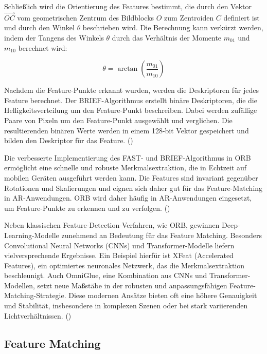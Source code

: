 Schließlich wird die Orientierung des Features bestimmt, die durch den Vektor \( \overrightarrow{OC} \) vom geometrischen Zentrum des Bildblocks \( O \) zum Zentroiden \( C \) definiert ist und durch den Winkel \( \theta \) beschrieben wird. Die Berechnung kann verkürzt werden, indem der Tangens des Winkels \( \theta \) durch das Verhältnis der Momente \( m_{01} \) und \( m_{10} \) berechnet wird:

\begin{equation}
    \theta = \arctan \left( \frac{m_{01}}{m_{10}} \right)
\end{equation}

Nachdem die Feature-Punkte erkannt wurden, werden die Deskriptoren für jedes Feature berechnet. Der BRIEF-Algorithmus erstellt binäre Deskriptoren, die die Helligkeitsverteilung um den Feature-Punkt beschreiben. Dabei werden zufällige Paare von Pixeln um den Feature-Punkt ausgewählt und verglichen. Die resultierenden binären Werte werden in einem 128-bit Vektor gespeichert und bilden den Deskriptor für das Feature. (\cite{gao2021vSLAM, calonder2010brief})

Die verbesserte Implementierung des FAST- und BRIEF-Algorithmus in ORB ermöglicht eine schnelle und robuste Merkmalsextraktion, die in Echtzeit auf mobilen Geräten ausgeführt werden kann. Die Features sind invariant gegenüber Rotationen und Skalierungen und eignen sich daher gut für das Feature-Matching in AR-Anwendungen. ORB wird daher häufig in AR-Anwendungen eingesetzt, um Feature-Punkte zu erkennen und zu verfolgen. (\cite{gao2021vSLAM, rublee2011orb})

Neben klassischen Feature-Detection-Verfahren, wie ORB, gewinnen Deep-Learning-Modelle zunehmend an Bedeutung für das Feature Matching. Besonders Convolutional Neural Networks (CNNs) und Transformer-Modelle liefern vielversprechende Ergebnisse. Ein Beispiel hierfür ist XFeat (Accelerated Features), ein optimiertes neuronales Netzwerk, das die Merkmalsextraktion beschleunigt. Auch OmniGlue, eine Kombination aus CNNs und Transformer-Modellen, setzt neue Maßstäbe in der robusten und anpassungsfähigen Feature-Matching-Strategie. Diese modernen Ansätze bieten oft eine höhere Genauigkeit und Stabilität, insbesondere in komplexen Szenen oder bei stark variierenden Lichtverhältnissen. (\cite{ghosh2024fmNN})

\subsection{Feature Matching}

